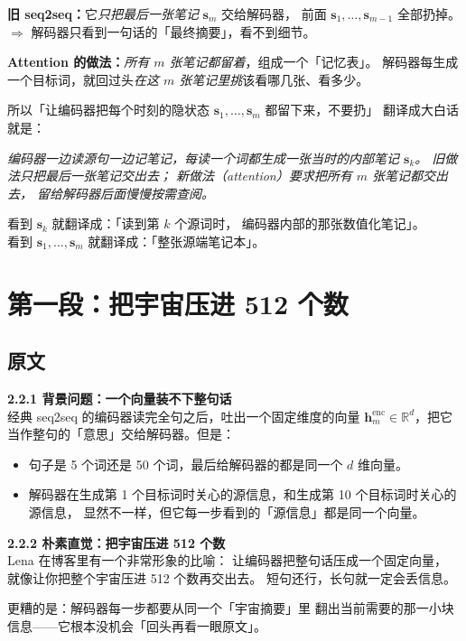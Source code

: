\documentclass[11pt,a4paper]{ctexart}
\newcommand{\vect}[1]{\boldsymbol{#1}}
\newcommand{\R}{\mathbb{R}}
\begin{document}
\textbf{旧 seq2seq：}它\emph{只把最后一张笔记} $\vect{s}_m$ 交给解码器，
前面 $\vect{s}_1, \dots, \vect{s}_{m-1}$ 全部扔掉。\\
$\Rightarrow$ 解码器只看到一句话的「最终摘要」，看不到细节。

\textbf{Attention 的做法：}\emph{所有 $m$ 张笔记都留着}，组成一个「记忆表」。
解码器每生成一个目标词，就回过头\emph{在这 $m$ 张笔记里挑}该看哪几张、看多少。

\begin{intuitionblock}
所以「让编码器把每个时刻的隐状态 $\vect{s}_1, \dots, \vect{s}_m$ 都留下来，不要扔」
翻译成大白话就是：

\emph{编码器一边读源句一边记笔记，每读一个词都生成一张当时的内部笔记 $\vect{s}_k$。
旧做法只把最后一张笔记交出去；
新做法（attention）要求把所有 $m$ 张笔记都交出去，
留给解码器后面慢慢按需查阅。}
\end{intuitionblock}

\begin{keypointblock}
看到 $\vect{s}_k$ 就翻译成：「读到第 $k$ 个源词时，
编码器内部的那张数值化笔记」。\\
看到 $\vect{s}_1, \dots, \vect{s}_m$ 就翻译成：「整张源端笔记本」。
\end{keypointblock}

\section{第一段：把宇宙压进 512 个数}

\subsection{原文}

\begin{quoteblock}
\textbf{2.2.1 背景问题：一个向量装不下整句话}\\[2pt]
经典 seq2seq 的编码器读完全句之后，吐出一个固定维度的向量
$\vect{h}^{\text{enc}}_m \in \R^d$，把它当作整句的「意思」交给解码器。但是：

\begin{itemize}
  \item 句子是 5 个词还是 50 个词，最后给解码器的都是同一个 $d$ 维向量。
  \item 解码器在生成第 1 个目标词时关心的源信息，和生成第 10 个目标词时关心的源信息，
        显然不一样，但它每一步看到的「源信息」都是同一个向量。
\end{itemize}

\textbf{2.2.2 朴素直觉：把宇宙压进 512 个数}\\[2pt]
Lena 在博客里有一个非常形象的比喻：
让编码器把整句话压成一个固定向量，
就像让你把整个宇宙压进 512 个数再交出去。
短句还行，长句就一定会丢信息。

更糟的是：解码器每一步都要从同一个「宇宙摘要」里
翻出当前需要的那一小块信息——它根本没机会「回头再看一眼原文」。
\end{quoteblock}
\end{document}
